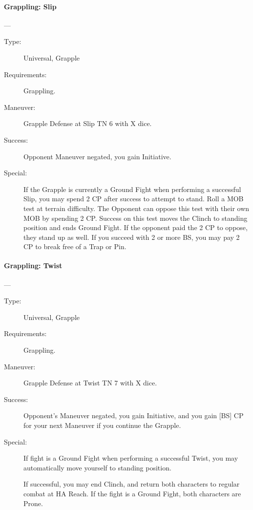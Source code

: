 \paragraph{Grappling: Slip \large} \label{man:grappling-slip}
---\quad {\large [X]}
\vspace{-10pt} \begin{description}
\item [Type:] Universal, Grapple
\item [Requirements:] Grappling.
\item [Maneuver:] Grapple Defense at Slip TN 6 with X dice.
\item [Success:] Opponent Maneuver negated, you gain Initiative.
\item [Special:] If the Grapple is currently a Ground Fight when performing a
  successful Slip, you may spend 2 CP after success to attempt to stand. Roll a
  MOB test at terrain difficulty. The Opponent can oppose this test with their
  own MOB by spending 2 CP. Success on this test moves the Clinch to standing
  position and ends Ground Fight. If the opponent paid the 2 CP to oppose, they
  stand up as well. If you succeed with 2 or more BS, you may pay 2 CP to break
  free of a Trap or Pin.  
\end{description}

\paragraph{Grappling: Twist \large} \label{man:grappling-twist}
---\quad {\large [X]}
\vspace{-10pt} \begin{description}
\item [Type:] Universal, Grapple
\item [Requirements:] Grappling.
\item [Maneuver:] Grapple Defense at Twist TN 7 with X dice.
\item [Success:] Opponent's Maneuver negated, you gain Initiative, and you gain
  [BS] CP for your next Maneuver if you continue the Grapple. 
\item [Special:] If fight is a Ground Fight when performing a successful Twist,
  you may automatically move yourself to standing position. 

If successful, you may end Clinch, and return both characters to regular combat
at HA Reach. If the fight is a Ground Fight, both characters are Prone. 
\end{description}

